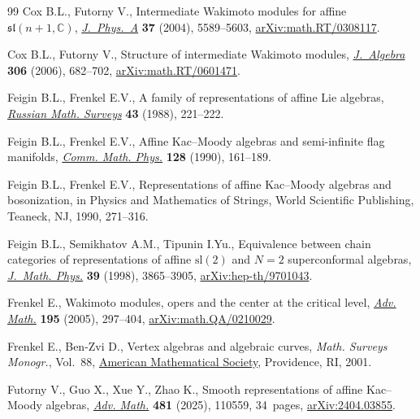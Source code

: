 \documentclass[10pt,a4paper]{amsart}
\numberwithin{equation}{section}
\theoremstyle{definition}
\newcommand{\1}{\textbf{1}}
\begin{document}
\begin{thebibliography}{99}
Cox B.L., Futorny V., Intermediate {W}akimoto modules for affine
 {$\mathfrak{sl}(n+1,\mathbb{C})$},
 \href{https://doi.org/10.1088/0305-4470/37/21/006}{\textit{J.~Phys.~A}}
 \textbf{37} (2004), 5589--5603,
 \href{http://arxiv.org/abs/math.RT/0308117}{arXiv:math.RT/0308117}.

Cox B.L., Futorny V., Structure of intermediate {W}akimoto modules,
 \href{https://doi.org/10.1016/j.jalgebra.2006.08.019}{\textit{J.~Algebra}}
 \textbf{306} (2006), 682--702,
 \href{http://arxiv.org/abs/math.RT/0601471}{arXiv:math.RT/0601471}.

Feigin B.L., Frenkel E.V., A family of representations of affine {L}ie
 algebras,
 \href{https://doi.org/10.1070/RM1988v043n05ABEH001935}{\textit{Russian Math.
 Surveys}} \textbf{43} (1988), 221--222.

Feigin B.L., Frenkel E.V., Affine {K}ac--{M}oody algebras and semi-infinite
 flag manifolds, \href{https://doi.org/10.1007/BF02097051}{\textit{Comm. Math.
 Phys.}} \textbf{128} (1990), 161--189.

Feigin B.L., Frenkel E.V., Representations of affine {K}ac--{M}oody algebras
 and bosonization, in Physics and Mathematics of Strings, World Scientific
 Publishing, Teaneck, NJ, 1990, 271--316.

Feigin B.L., Semikhatov A.M., Tipunin I.Yu., Equivalence between chain
 categories of representations of affine {$\mathrm{sl}(2)$} and {$N=2$}
 superconformal algebras,
 \href{https://doi.org/10.1063/1.532473}{\textit{J.~Math. Phys.}} \textbf{39}
 (1998), 3865--3905,
 \href{http://arxiv.org/abs/hep-th/9701043}{arXiv:hep-th/9701043}.

Frenkel E., Wakimoto modules, opers and the center at the critical level,
 \href{https://doi.org/10.1016/j.aim.2004.08.002}{\textit{Adv. Math.}}
 \textbf{195} (2005), 297--404,
 \href{http://arxiv.org/abs/math.QA/0210029}{arXiv:math.QA/0210029}.

Frenkel E., Ben-Zvi D., Vertex algebras and algebraic curves, \textit{Math.
 Surveys Monogr.}, Vol.~88, \href{https://doi.org/10.1090/surv/088}{American
 Mathematical Society}, Providence, RI, 2001.

Futorny V., Guo X., Xue Y., Zhao K., Smooth representations of affine
 {K}ac--{M}oody algebras,
 \href{https://doi.org/10.1016/j.aim.2025.110559}{\textit{Adv. Math.}}
 \textbf{481} (2025), 110559, 34~pages,
 \href{http://arxiv.org/abs/2404.03855}{arXiv:2404.03855}.


\end{thebibliography}
\end{document}
